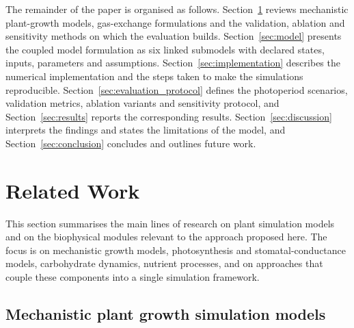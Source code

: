 \documentclass[a4paper,fleqn]{cas-sc}
\begin{document}
The remainder of the paper is organised as follows. Section~\ref{sec:related_work} reviews mechanistic plant-growth models, gas-exchange formulations and the validation, ablation and sensitivity methods on which the evaluation builds. Section~\ref{sec:model} presents the coupled model formulation as six linked submodels with declared states, inputs, parameters and assumptions. Section~\ref{sec:implementation} describes the numerical implementation and the steps taken to make the simulations reproducible. Section~\ref{sec:evaluation_protocol} defines the photoperiod scenarios, validation metrics, ablation variants and sensitivity protocol, and Section~\ref{sec:results} reports the corresponding results. Section~\ref{sec:discussion} interprets the findings and states the limitations of the model, and Section~\ref{sec:conclusion} concludes and outlines future work.

\section{Related Work}
\label{sec:related_work}
This section summarises the main lines of research on plant simulation models and on the biophysical modules relevant to the approach proposed here. The focus is on mechanistic growth models, photosynthesis and stomatal-conductance models, carbohydrate dynamics, nutrient processes, and on approaches that couple these components into a single simulation framework.

\subsection{Mechanistic plant growth simulation models}
\end{document}
